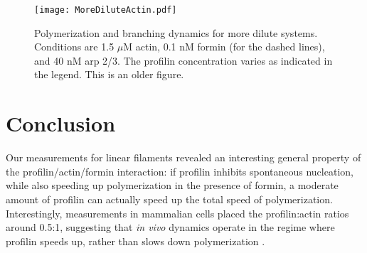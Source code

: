 \documentclass[11pt]{article}
\newcommand{\red}[1]{\color{red}#1\normalcolor}
\begin{document}
\begin{figure}
\centering
\texttt{[image: MoreDiluteActin.pdf]}
\caption{\label{fig:Actin15} Polymerization and branching dynamics for more dilute systems. Conditions are 1.5 $\mu$M actin, 0.1 nM formin (for the dashed lines), and 40 nM arp 2/3. The profilin concentration varies as indicated in the legend. \red{This is an older figure.} }
\end{figure}

\section{Conclusion}
Our measurements for linear filaments revealed an interesting general property of the profilin/actin/formin interaction: if profilin inhibits spontaneous nucleation, while also speeding up polymerization in the presence of formin, a moderate amount of profilin can actually speed up the total speed of polymerization. Interestingly, measurements in mammalian cells placed the profilin:actin ratios around 0.5:1, suggesting that \emph{in vivo} dynamics operate in the regime where profilin speeds up, rather than slows down polymerization \cite{funk2019profilin}.
\end{document}
